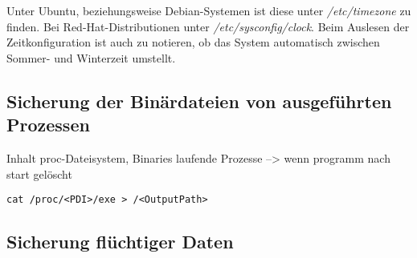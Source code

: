 Unter Ubuntu, beziehungsweise Debian-Systemen ist diese unter \textit{/etc/timezone} zu finden. Bei Red-Hat-Distributionen unter \textit{/etc/sysconfig/clock}.
Beim Auslesen der Zeitkonfiguration ist auch zu notieren, ob das System automatisch zwischen Sommer- und Winterzeit umstellt.

\subsection{Sicherung der Binärdateien von ausgeführten Prozessen}
Inhalt proc-Dateisystem, Binaries laufende Prozesse --> wenn programm nach start gelöscht

\begin{verbatim}
cat /proc/<PDI>/exe > /<OutputPath>
\end{verbatim}

\subsection{Sicherung flüchtiger Daten}

